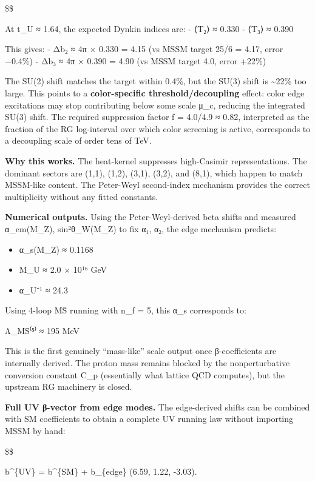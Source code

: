 \documentclass[11pt,a4paper]{article}
\theoremstyle{remark}
\providecommand{\tightlist}{%
  \setlength{\itemsep}{0pt}\setlength{\parskip}{0pt}}
\begin{document}
\$\$

At t\_U ≈ 1.64, the expected Dynkin indices are:
- ⟨T₂⟩ ≈ 0.330
- ⟨T₃⟩ ≈ 0.390

This gives:
- Δb₂ ≈ 4π × 0.330 = 4.15 (vs MSSM target 25/6 = 4.17, error −0.4\%)
- Δb₃ ≈ 4π × 0.390 = 4.90 (vs MSSM target 4.0, error +22\%)

The SU(2) shift matches the target within 0.4\%, but the SU(3) shift is \textasciitilde22\% too large. This points to a \textbf{color-specific threshold/decoupling} effect: color edge excitations may stop contributing below some scale μ\_c, reducing the integrated SU(3) shift. The required suppression factor f = 4.0/4.9 ≈ 0.82, interpreted as the fraction of the RG log-interval over which color screening is active, corresponds to a decoupling scale of order tens of TeV.

\textbf{Why this works.} The heat-kernel suppresses high-Casimir representations. The dominant sectors are (1,1), (1,2), (3,1), (3,2), and (8,1), which happen to match MSSM-like content. The Peter-Weyl second-index mechanism provides the correct multiplicity without any fitted constants.

\textbf{Numerical outputs.} Using the Peter-Weyl-derived beta shifts and measured α\_em(M\_Z), sin²θ\_W(M\_Z) to fix α₁, α₂, the edge mechanism predicts:

\begin{itemize}
\tightlist
\item
  α\_s(M\_Z) ≈ 0.1168
\item
  M\_U ≈ 2.0 × 10¹⁶ GeV
\item
  α\_U⁻¹ ≈ 24.3
\end{itemize}

Using 4-loop MS̄ running with n\_f = 5, this α\_s corresponds to:

Λ\_MS̄⁽⁵⁾ ≈ 195 MeV

This is the first genuinely ``mass-like'' scale output once β-coefficients are
internally derived. The proton mass remains blocked by the nonperturbative
conversion constant C\_p (essentially what lattice QCD computes), but the
upstream RG machinery is closed.

\textbf{Full UV β-vector from edge modes.} The edge-derived shifts can be combined with SM coefficients to obtain a complete UV running law without importing MSSM by hand:

\$\$

b\^{}\{\rm UV\} = b\^{}\{\rm SM\} + \Delta b\_\{\rm edge\} \approx (6.59, 1.22, -3.03).
\end{document}

